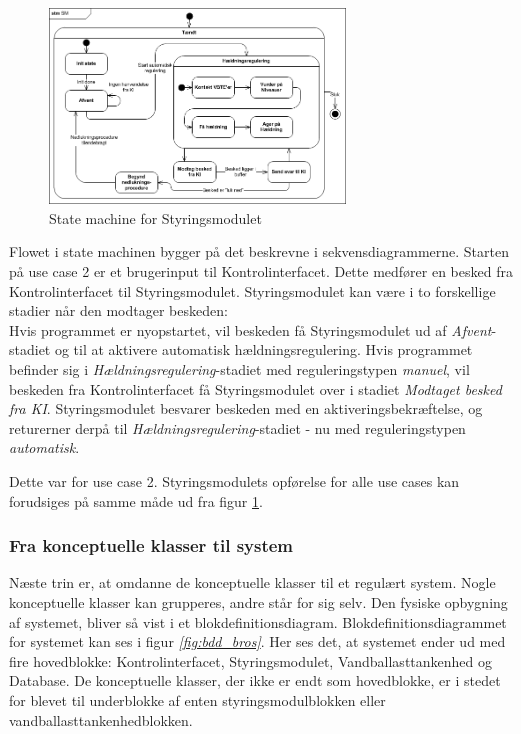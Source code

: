 \begin{figure}[H]
\centering
\includegraphics[width=0.7\textwidth]{billeder/Systemarkitektur/stm_sm}
\caption{State machine for Styringsmodulet}
\label{fig:stm_sm}
\end{figure}

Flowet i state machinen bygger på det beskrevne i sekvensdiagrammerne. Starten på use case 2 er et brugerinput til Kontrolinterfacet. Dette medfører en besked fra Kontrolinterfacet til Styringsmodulet. Styringsmodulet kan være i to forskellige stadier når den modtager beskeden:\\
Hvis programmet er nyopstartet, vil beskeden få Styringsmodulet ud af \textit{Afvent}-stadiet og til at aktivere automatisk hældningsregulering. Hvis programmet befinder sig i \textit{Hældningsregulering}-stadiet med reguleringstypen \textit{manuel}, vil beskeden fra Kontrolinterfacet få Styringsmodulet over i stadiet \textit{Modtaget besked fra KI}. Styringsmodulet besvarer beskeden med en aktiveringsbekræftelse, og returerner derpå til \textit{Hældningsregulering}-stadiet - nu med reguleringstypen \textit{automatisk}.

Dette var for use case 2. Styringsmodulets opførelse for alle use cases kan forudsiges på samme måde ud fra figur \ref{fig:stm_sm}. 

\subsubsection{Fra konceptuelle klasser til system}
Næste trin er, at omdanne de konceptuelle klasser til et regulært system. Nogle konceptuelle klasser kan grupperes, andre står for sig selv. Den fysiske opbygning af systemet, bliver så vist i et blokdefinitionsdiagram. Blokdefinitionsdiagrammet for systemet kan ses i figur \textit{\ref{fig:bdd_bros}}. Her ses det, at systemet ender ud med fire hovedblokke: Kontrolinterfacet, Styringsmodulet, Vandballasttankenhed og Database. De konceptuelle klasser, der ikke er endt som hovedblokke, er i stedet for blevet til underblokke af enten styringsmodulblokken eller vandballasttankenhedblokken.

